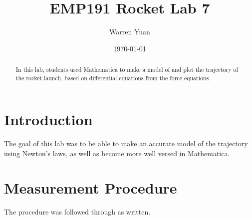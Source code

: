 \documentclass[a4paper,11pt]{article}
\title{\vspace{-2.0cm}EMP191 Rocket Lab 7}
\author{Warren Yuan}
\date{\today}
\begin{document}
    
    \maketitle
    
    \begin{abstract}
     {In this lab, students used Mathematica to make a model of and plot the trajectory of the rocket launch, based on differential equations from the force equations.}
    \end{abstract}
    
    \section{Introduction}
    {\quad The goal of this lab was to be able to make an accurate model of the trajectory using Newton's laws, as well as become more well versed in Mathematica.}
    
    \section{Measurement Procedure}
    {\quad The procedure was followed through as written.}
    
    
\end{document}
